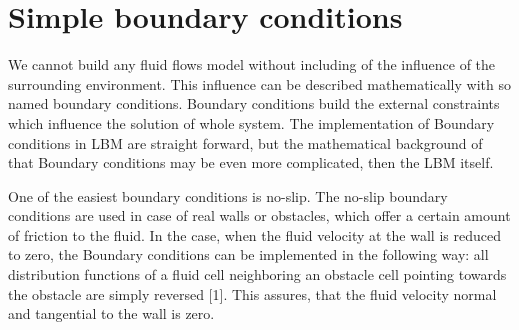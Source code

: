 
\section{Simple boundary conditions}

We cannot build any fluid flows model without including of the influence of the surrounding environment. This influence can be described mathematically with so named boundary conditions. Boundary conditions build the external constraints which influence the solution of whole system. The implementation of Boundary conditions in LBM are straight forward, but the mathematical background of that Boundary conditions may be even more complicated, then the LBM itself.

One of the easiest boundary conditions is no-slip. The no-slip boundary conditions are used in case of real walls or obstacles, which offer a certain amount of friction to the fluid. In the case, when the fluid velocity at the wall is reduced to zero, the Boundary conditions can be implemented in the following way: all distribution functions of a fluid cell neighboring an obstacle cell pointing towards the obstacle are simply reversed [1]. This assures, that the fluid velocity normal and tangential to the wall is zero.

